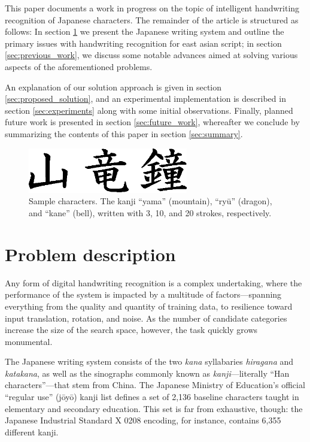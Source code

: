 \documentclass[10pt,conference,a4paper]{IEEEtran}
\begin{document}
	This paper documents a work in progress on the topic of intelligent handwriting recognition of Japanese characters.
	The remainder of the article is structured as follows:
	In section \ref{sec:problem_description} we present the Japanese writing system and outline the primary issues with handwriting recognition for east asian script;
	in section \ref{sec:previous_work}, we discuss some notable advances aimed at solving various aspects of the aforementioned problems.

	An explanation of our solution approach is given in section \ref{sec:proposed_solution}, and an experimental implementation is described in section \ref{sec:experiments}
	along with some initial observations. Finally, planned future work is presented in section \ref{sec:future_work}, whereafter we conclude by summarizing the
	contents of this paper in section \ref{sec:summary}.

	
	\begin{figure}
		\centering
		\includegraphics[width=2.75in]{./fig/yama-ryuu-kane.eps}
		\caption{Sample characters. The kanji ``yama'' (mountain), ``ry\=u'' (dragon), and ``kane'' (bell), written with 3, 10, and 20 strokes, respectively.}
		\label{fig_kanji_sample}
	\end{figure}



	\section{Problem description}
	\label{sec:problem_description}

	Any form of digital handwriting recognition is a complex undertaking,
	where the performance of the system is impacted by a multitude of factors---spanning
	everything from the quality and quantity of training data, to resilience toward input
	translation, rotation, and noise. As the number of candidate categories increase
	the size of the search space, however, the task quickly grows monumental.

	The Japanese writing system consists of the two \emph{kana} syllabaries \emph{hiragana} and \emph{katakana},
	as well as the sinographs commonly known as \emph{kanji}---literally ``Han characters''---that stem from China.
	The Japanese Ministry of Education's official ``regular use'' (j\=oy\=o) kanji list defines a set of 2,136
	baseline characters taught in elementary and secondary education. \cite{hadamitzky2012japanese}
	This set is far from exhaustive, though: the Japanese Industrial Standard X 0208 encoding, for instance, contains 6,355 different kanji.
\end{document}
